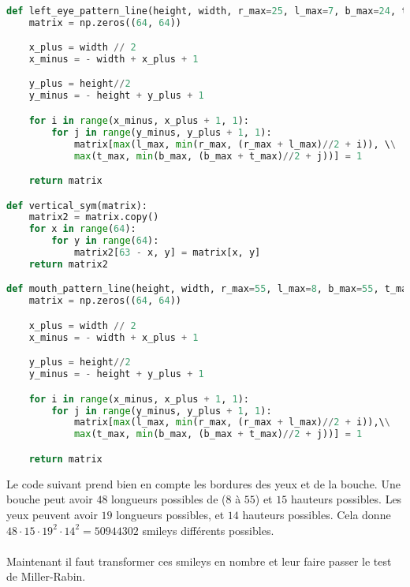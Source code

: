 \documentclass{article}
\begin{document}
\begin{lstlisting}[language = Python]

def left_eye_pattern_line(height, width, r_max=25, l_max=7, b_max=24, t_max=11):
    matrix = np.zeros((64, 64))

    x_plus = width // 2
    x_minus = - width + x_plus + 1

    y_plus = height//2
    y_minus = - height + y_plus + 1

    for i in range(x_minus, x_plus + 1, 1):
        for j in range(y_minus, y_plus + 1, 1):
            matrix[max(l_max, min(r_max, (r_max + l_max)//2 + i)), \\
            max(t_max, min(b_max, (b_max + t_max)//2 + j))] = 1

    return matrix

def vertical_sym(matrix):
    matrix2 = matrix.copy()
    for x in range(64):
        for y in range(64):
            matrix2[63 - x, y] = matrix[x, y]
    return matrix2

def mouth_pattern_line(height, width, r_max=55, l_max=8, b_max=55, t_max=41):
    matrix = np.zeros((64, 64))

    x_plus = width // 2
    x_minus = - width + x_plus + 1

    y_plus = height//2
    y_minus = - height + y_plus + 1

    for i in range(x_minus, x_plus + 1, 1):
        for j in range(y_minus, y_plus + 1, 1):
            matrix[max(l_max, min(r_max, (r_max + l_max)//2 + i)),\\
            max(t_max, min(b_max, (b_max + t_max)//2 + j))] = 1

    return matrix

\end{lstlisting}

Le code suivant prend bien en compte les bordures des yeux et de la bouche. Une bouche peut avoir $48$ longueurs possibles de ($8$ à $55$) et $15$ hauteurs possibles. Les yeux peuvent avoir $19$ longueurs possibles, et $14$ hauteurs possibles. Cela donne
$48 \cdot 15 \cdot 19^2 \cdot 14^2 = 50 944 302$ smileys différents possibles.\\ \\
Maintenant il faut transformer ces smileys en nombre et leur faire passer le test de Miller-Rabin. 
\end{document}
